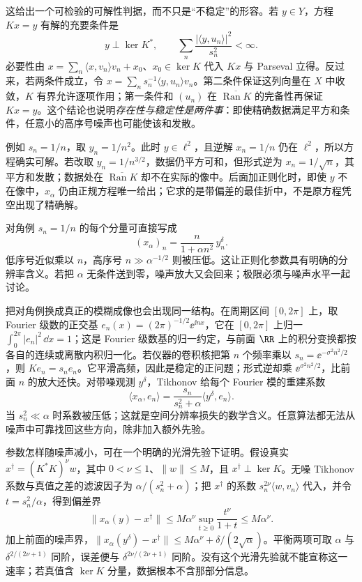 这给出一个可检验的可解性判据，而不只是“不稳定”的形容。若 \(y\in Y\)，方程 \(Kx=y\) 有解的充要条件是
\begin{equation}
 y\perp\ker K^*,\qquad
 \sum_n\frac{|\langle y,u_n\rangle|^2}{s_n^2}<\infty.
 \label{eq:math-picard-condition}
\end{equation}
必要性由 \(x=\sum_n\langle x,v_n\rangle v_n+x_0\)、\(x_0\in\ker K\) 代入 \(Kx\) 与 Parseval 立得。反过来，若两条件成立，令 \(x=\sum_n s_n^{-1}\langle y,u_n\rangle v_n\)。第二条件保证这列向量在 \(X\) 中收敛，\(K\) 有界允许逐项作用；第一条件和 \((u_n)\) 在 \(\overline{\operatorname{Ran}K}\) 的完备性再保证 \(Kx=y\)。这个结论也说明\emph{存在性与稳定性是两件事}：即使精确数据满足平方和条件，任意小的高序号噪声也可能使该和发散。

例如 \(s_n=1/n\)，取 \(y_n=1/n^2\)。此时 \(y\in\ell^2\)，且逆解 \(x_n=1/n\) 仍在 \(\ell^2\)，所以方程确实可解。若改取 \(y_n=1/n^{3/2}\)，数据仍平方可和，但形式逆为 \(x_n=1/\sqrt n\)，其平方和发散；数据处在 \(\overline{\operatorname{Ran}K}\) 却不在实际的像中。后面加正则化时，即使 \(y\) 不在像中，\(x_\alpha\) 仍由正规方程唯一给出；它求的是带偏差的最佳折中，不是原方程凭空出现了精确解。

对角例 \(s_n=1/n\) 的每个分量可直接写成
\[
(x_\alpha)_n=\frac{n}{1+\alpha n^2}\,y_n^\delta.
\]
低序号近似乘以 \(n\)，高序号 \(n\gg\alpha^{-1/2}\) 则被压低。这让正则化参数具有明确的分辨率含义。若把 \(\alpha\) 无条件送到零，噪声放大又会回来；极限必须与噪声水平一起讨论。

把对角例换成真正的模糊成像也会出现同一结构。在周期区间 \([0,2\pi]\) 上，取 Fourier 级数的正交基 \(e_n(x)=(2\pi)^{-1/2}\ee^{\ii nx}\)，它在 \([0,2\pi]\) 上归一 \(\int_0^{2\pi}|e_n|^2\,\dd x=1\)；这是 Fourier 级数基的归一约定，与前面 $\RR$ 上的积分变换都按各自的连续或离散内积归一化。若仪器的卷积核把第 \(n\) 个频率乘以 \(s_n=\ee^{-\sigma^2n^2/2}\)，则 \(Ke_n=s_ne_n\)。它平滑高频，因此是稳定的正问题；形式逆却乘 \(\ee^{\sigma^2n^2/2}\)，比前面 \(n\) 的放大还快。对带噪观测 \(y^\delta\)，Tikhonov 给每个 Fourier 模的重建系数
\[
\langle x_\alpha,e_n\rangle
=\frac{s_n}{s_n^2+\alpha}\langle y^\delta,e_n\rangle.
\]
当 \(s_n^2\ll\alpha\) 时系数被压低；这就是空间分辨率损失的数学含义。任意算法都无法从噪声中可靠找回这些方向，除非加入额外先验。

参数怎样随噪声减小，可在一个明确的光滑先验下证明。假设真实 \(x^\dagger=(K^*K)^\nu w\)，其中 \(0<\nu\le1\)、\(\|w\|\le M\)，且 \(x^\dagger\perp\ker K\)。无噪 Tikhonov 系数与真值之差的滤波因子为 \(\alpha/(s_n^2+\alpha)\)；把 \(x^\dagger\) 的系数 \(s_n^{2\nu}\langle w,v_n\rangle\) 代入，并令 \(t=s_n^2/\alpha\)，得到偏差界
\[
\|x_\alpha(y)-x^\dagger\|
\le M\alpha^\nu\sup_{t\ge0}\frac{t^\nu}{1+t}
\le M\alpha^\nu.
\]
加上前面的噪声界，\(\|x_\alpha(y^\delta)-x^\dagger\|\le M\alpha^\nu+\delta/(2\sqrt\alpha)\)。平衡两项可取 \(\alpha\) 与 \(\delta^{2/(2\nu+1)}\) 同阶，误差便与 \(\delta^{2\nu/(2\nu+1)}\) 同阶。没有这个光滑先验就不能宣称这一速率；若真值含 \(\ker K\) 分量，数据根本不含那部分信息。



